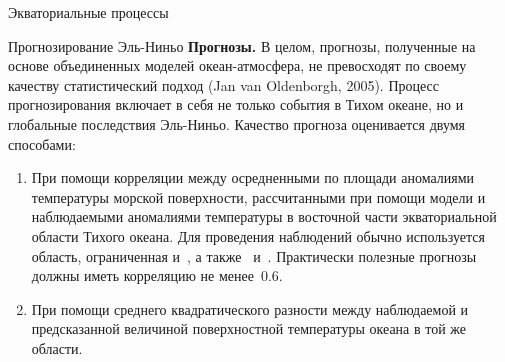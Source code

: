 \begin{chapter}{Экваториальные процессы}
\begin{section}{Прогнозирование Эль-Ниньо}
\textbf{Прогнозы.}%
 В целом, прогнозы, полученные на основе
объединенных моделей океан-атмосфера, не превосходят по своему качеству
статистический подход (Jan van Oldenborgh, 2005). Процесс прогнозирования
включает в себя не только события в Тихом океане, но и глобальные последствия
Эль-Ниньо. Качество прогноза оценивается двумя способами:
%
\begin{enumerate}
\item
При помощи корреляции между осредненными по площади аномалиями температуры
морской поверхности,
рассчитанными при помощи модели и наблюдаемыми аномалиями температуры
в восточной части экваториальной области Тихого океана. 
Для проведения наблюдений обычно используется область, ограниченная
 и~, а также~ 
и~. Практически полезные прогнозы должны иметь корреляцию
не менее~$0.6$.
%

\item
При помощи среднего квадратического разности между наблюдаемой и предсказанной
величиной поверхностной температуры океана в той же области.
%
\end{enumerate}


\end{section}
\end{chapter}
